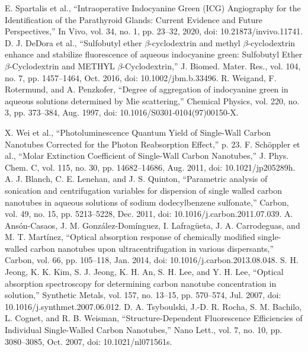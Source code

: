 \begin{thebibliography}{99}
 E. Spartalis et al., “Intraoperative Indocyanine Green (ICG) Angiography for the Identification of the Parathyroid Glands: Current Evidence and Future Perspectives,” In Vivo, vol. 34, no. 1, pp. 23–32, 2020, doi: 10.21873/invivo.11741.
D. J. DeDora et al., “Sulfobutyl ether $\beta$-cyclodextrin and methyl $\beta$-cyclodextrin enhance and stabilize fluorescence of aqueous indocyanine green: Sulfobutyl Ether $\beta$-Cyclodextrin and METHYL $\beta$-Cyclodextrin,” J. Biomed. Mater. Res., vol. 104, no. 7, pp. 1457–1464, Oct. 2016, doi: 10.1002/jbm.b.33496.
R. Weigand, F. Rotermund, and A. Penzkofer, “Degree of aggregation of indocyanine green in aqueous solutions determined by Mie scattering,” Chemical Physics, vol. 220, no. 3, pp. 373–384, Aug. 1997, doi: 10.1016/S0301-0104(97)00150-X.

 X. Wei et al., “Photoluminescence Quantum Yield of Single-Wall Carbon Nanotubes Corrected for the Photon Reabsorption Effect,” p. 23.
 F. Schöppler et al., “Molar Extinction Coefficient of Single-Wall Carbon Nanotubes,” J. Phys. Chem. C, vol. 115, no. 30, pp. 14682–14686, Aug. 2011, doi: 10.1021/jp205289h.
 A. J. Blanch, C. E. Lenehan, and J. S. Quinton, “Parametric analysis of sonication and centrifugation variables for dispersion of single walled carbon nanotubes in aqueous solutions of sodium dodecylbenzene sulfonate,” Carbon, vol. 49, no. 15, pp. 5213–5228, Dec. 2011, doi: 10.1016/j.carbon.2011.07.039.
 A. Ansón-Casaos, J. M. González-Domínguez, I. Lafragüeta, J. A. Carrodeguas, and M. T. Martínez, “Optical absorption response of chemically modified single-walled carbon nanotubes upon ultracentrifugation in various dispersants,” Carbon, vol. 66, pp. 105–118, Jan. 2014, doi: 10.1016/j.carbon.2013.08.048.
S. H. Jeong, K. K. Kim, S. J. Jeong, K. H. An, S. H. Lee, and Y. H. Lee, “Optical absorption spectroscopy for determining carbon nanotube concentration in solution,” Synthetic Metals, vol. 157, no. 13–15, pp. 570–574, Jul. 2007, doi: 10.1016/j.synthmet.2007.06.012.
 D. A. Tsyboulski, J.-D. R. Rocha, S. M. Bachilo, L. Cognet, and R. B. Weisman, “Structure-Dependent Fluorescence Efficiencies of Individual Single-Walled Carbon Nanotubes,” Nano Lett., vol. 7, no. 10, pp. 3080–3085, Oct. 2007, doi: 10.1021/nl071561s.



\end{thebibliography}
